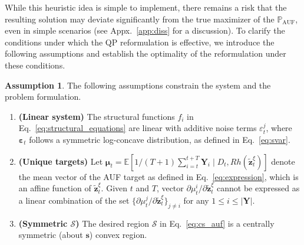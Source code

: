 \documentclass{article}
\theoremstyle{plain}
\theoremstyle{definition}
\newtheorem{assumption}[theorem]{Assumption}
\theoremstyle{remark}
\def \Eq {Eq.}
\def \sS {\mathcal{S}}
\def \Y {\mathbf{Y}}
\def \s {\mathbf{s}}
\def \z {\mathbf{z}}
\begin{document}
While this heuristic idea is simple to implement, there remains a risk that the resulting solution may deviate significantly from the true maximizer of the \(\mathbb{P}_{\operatorname{AUF}}\), even in simple scenarios (see Appx.~\ref{app:diss} for a discussion). 
To clarify the conditions under which the QP reformulation is effective, we introduce the following assumptions and establish the optimality of the reformulation under these conditions. 

\begin{assumption}
  \label{ass:mild}
  The following assumptions constrain the system and the problem formulation.
  \vspace{-0.1in}
  \begin{enumerate}[leftmargin=12pt, itemsep=-0.05in]
    \item \textbf{(Linear system)} The structural functions \(f_i\) in \Eq~\eqref{eq:structural_equations} are linear with additive noise terms \(\varepsilon^j_t\), where \(\bm{\varepsilon}_t\) follows a symmetric log-concave distribution, as defined in \Eq~\eqref{eq:svar}.
    \item \textbf{(Unique targets)} Let \(\bm{\mu}_t = \mathbb{E}[1/(T+1)\sum_{i=t}^{t+T} \Y_i \mid D_t, Rh(\tilde{\z}^\xi_t)]\) denote the mean vector of the AUF target as defined in \Eq~\eqref{eq:expression}, which is an affine function of \(\tilde{\z}^\xi_t\). 
    Given \(t\) and \(T\), vector \(\partial \mu_t^i / \partial \tilde{\z}^\xi_t\) cannot be expressed as a linear combination of the set \(\{\partial \mu_t^j / \partial \tilde{\z}^\xi_t\}_{j \neq i}\) for any \(1 \leq i \leq |\Y|\). 
    \item \textbf{(Symmetric \(\sS\))} The desired region \(\sS\) in \Eq~\eqref{eq:cs_auf} is a centrally symmetric (about \(\s\)) convex region.
  \end{enumerate}
\end{assumption}
\end{document}
